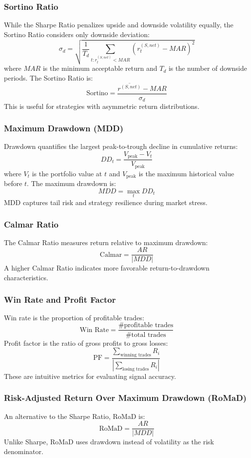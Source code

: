 \subsubsection{Sortino Ratio}  
While the Sharpe Ratio penalizes upside and downside volatility equally, the Sortino Ratio considers only downside deviation:
\[
\sigma_d = \sqrt{\frac{1}{T_d} \sum_{t: r_t^{(S,net)} < MAR} (r_t^{(S,net)} - MAR)^2}
\]
where $MAR$ is the minimum acceptable return and $T_d$ is the number of downside periods. The Sortino Ratio is:
\[
\text{Sortino} = \frac{\overline{r^{(S,net)}} - MAR}{\sigma_d}
\]
This is useful for strategies with asymmetric return distributions.

\subsubsection{Maximum Drawdown (MDD)}  
Drawdown quantifies the largest peak-to-trough decline in cumulative returns:
\[
DD_t = \frac{V_{\text{peak}} - V_t}{V_{\text{peak}}}
\]
where $V_t$ is the portfolio value at $t$ and $V_{\text{peak}}$ is the maximum historical value before $t$. The maximum drawdown is:
\[
MDD = \max_{t} DD_t
\]
MDD captures tail risk and strategy resilience during market stress.

\subsubsection{Calmar Ratio}  
The Calmar Ratio measures return relative to maximum drawdown:
\[
\text{Calmar} = \frac{AR}{|MDD|}
\]
A higher Calmar Ratio indicates more favorable return-to-drawdown characteristics.

\subsubsection{Win Rate and Profit Factor}  
Win rate is the proportion of profitable trades:
\[
\text{Win Rate} = \frac{\text{\# profitable trades}}{\text{\# total trades}}
\]
Profit factor is the ratio of gross profits to gross losses:
\[
\text{PF} = \frac{\sum_{\text{winning trades}} R_i}{\left| \sum_{\text{losing trades}} R_i \right|}
\]
These are intuitive metrics for evaluating signal accuracy.

\subsubsection{Risk-Adjusted Return Over Maximum Drawdown (RoMaD)}  
An alternative to the Sharpe Ratio, RoMaD is:
\[
\text{RoMaD} = \frac{AR}{|MDD|}
\]
Unlike Sharpe, RoMaD uses drawdown instead of volatility as the risk denominator.

